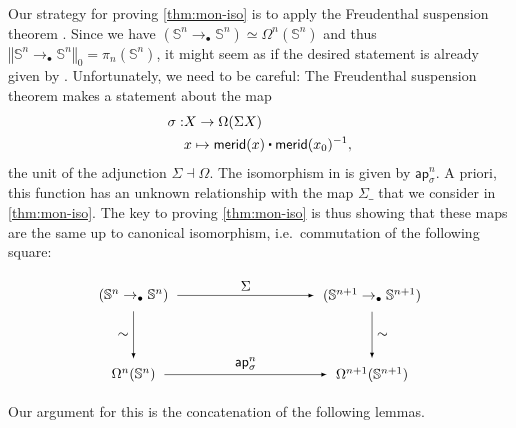 \documentclass[11pt,a4paper,oneside,reqno]{amsart}
\theoremstyle{definition}
\theoremstyle{remark}
\newcommand{\sph}[1]{{\mathbb S}^{#1}}
\newcommand{\ct}{%
  \mathchoice{\mathbin{\raisebox{0.5ex}{$\displaystyle\centerdot$}}}%
             {\mathbin{\raisebox{0.5ex}{$\centerdot$}}}%
             {\mathbin{\raisebox{0.25ex}{$\scriptstyle\,\centerdot\,$}}}%
             {\mathbin{\raisebox{0.1ex}{$\scriptscriptstyle\,\centerdot\,$}}}
}
\newcommand{\trunc}[2]{\mathopen{}\left\Vert #2\right\Vert_{#1}\mathclose{}}
\newcommand{\pointedm}{\rightarrow_\bullet}
\begin{document}
Our strategy for proving \cref{thm:mon-iso} is to apply the
Freudenthal suspension theorem \cite[Thm 8.6.4]{HoTT}. 
Since we have $(\sph n \pointedm \sph n) \simeq \Omega^n(\sph n)$ and thus $\trunc 0 {\sph n \pointedm \sph n} = \pi_n(\sph n)$, it might seem as if 
the desired statement is already given by \cite[Cor 8.6.15]{HoTT}.
Unfortunately, we need to be careful: 
The Freudenthal suspension theorem makes a statement about the map
\begin{align}
 \sigma : &X \to \Omega(\Sigma X) \\
 &x \mapsto \mathsf{merid}(x) \ct \mathsf{merid}(x_0)^{-1},
\end{align}
the unit of the adjunction $\Sigma \dashv \Omega$.
The isomorphism in \cite[Cor 8.6.15]{HoTT}
is given by $\mathsf{ap}^n_\sigma$.
A priori, this function has an unknown relationship with the map $\Sigma \_$ that we consider in \cref{thm:mon-iso}.
The key to proving \cref{thm:mon-iso} is thus showing that these maps are the same up to canonical isomorphism, i.e.\ commutation of the following square:

\begin{equation} \label{eq:needs-to-commute}
\begin{tikzpicture}[x=6cm,y=-2cm,baseline=(current bounding box.center)]
 \tikzset{arrow/.style={shorten >=0.1cm,shorten <=.1cm,-latex}}
 \node (A) at (0,0) {$(\sph n \pointedm \sph n)$}; 
 \node (B) at (0,1) {$\Omega^n(\sph n)$}; 
 \node (C) at (1,1) {$\Omega^{n+1}(\sph {n+1})$}; 
 \node (D) at (1,0) {$(\sph {n+1} \pointedm \sph {n+1})$}; 

 \draw[arrow] (A) to node [left] {$\sim$} (B);
 \draw[arrow] (B) to node [above] {$\mathsf{ap}^n_\sigma$} (C);
 \draw[arrow] (D) to node [right] {$\sim$} (C);
 \draw[arrow] (A) to node [above] {$\Sigma$} (D);
\end{tikzpicture}
\end{equation}

Our argument for this is the concatenation of the following lemmas.
\end{document}
